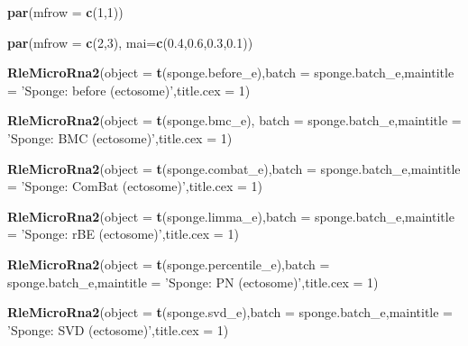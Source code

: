 \documentclass[]{book}
\newenvironment{Shaded}{\begin{snugshade}}{\end{snugshade}}
\newcommand{\KeywordTok}[1]{\textcolor[rgb]{0.13,0.29,0.53}{\textbf{#1}}}
\newcommand{\DataTypeTok}[1]{\textcolor[rgb]{0.13,0.29,0.53}{#1}}
\newcommand{\DecValTok}[1]{\textcolor[rgb]{0.00,0.00,0.81}{#1}}
\newcommand{\FloatTok}[1]{\textcolor[rgb]{0.00,0.00,0.81}{#1}}
\newcommand{\StringTok}[1]{\textcolor[rgb]{0.31,0.60,0.02}{#1}}
\newcommand{\NormalTok}[1]{#1}
\begin{document}
\begin{Shaded}
\begin{Highlighting}[]
\KeywordTok{par}\NormalTok{(}\DataTypeTok{mfrow =} \KeywordTok{c}\NormalTok{(}\DecValTok{1}\NormalTok{,}\DecValTok{1}\NormalTok{))}
\end{Highlighting}
\end{Shaded}

\begin{Shaded}
\begin{Highlighting}[]
\KeywordTok{par}\NormalTok{(}\DataTypeTok{mfrow =} \KeywordTok{c}\NormalTok{(}\DecValTok{2}\NormalTok{,}\DecValTok{3}\NormalTok{), }\DataTypeTok{mai=}\KeywordTok{c}\NormalTok{(}\FloatTok{0.4}\NormalTok{,}\FloatTok{0.6}\NormalTok{,}\FloatTok{0.3}\NormalTok{,}\FloatTok{0.1}\NormalTok{))}

\KeywordTok{RleMicroRna2}\NormalTok{(}\DataTypeTok{object =} \KeywordTok{t}\NormalTok{(sponge.before_e),}\DataTypeTok{batch =}\NormalTok{ sponge.batch_e,}\DataTypeTok{maintitle =} \StringTok{'Sponge: before (ectosome)'}\NormalTok{,}\DataTypeTok{title.cex =} \DecValTok{1}\NormalTok{)}

\KeywordTok{RleMicroRna2}\NormalTok{(}\DataTypeTok{object =} \KeywordTok{t}\NormalTok{(sponge.bmc_e), }\DataTypeTok{batch =}\NormalTok{ sponge.batch_e,}\DataTypeTok{maintitle =} \StringTok{'Sponge: BMC (ectosome)'}\NormalTok{,}\DataTypeTok{title.cex =} \DecValTok{1}\NormalTok{)}

\KeywordTok{RleMicroRna2}\NormalTok{(}\DataTypeTok{object =} \KeywordTok{t}\NormalTok{(sponge.combat_e),}\DataTypeTok{batch =}\NormalTok{ sponge.batch_e,}\DataTypeTok{maintitle =} \StringTok{'Sponge: ComBat (ectosome)'}\NormalTok{,}\DataTypeTok{title.cex =} \DecValTok{1}\NormalTok{)}

\KeywordTok{RleMicroRna2}\NormalTok{(}\DataTypeTok{object =} \KeywordTok{t}\NormalTok{(sponge.limma_e),}\DataTypeTok{batch =}\NormalTok{ sponge.batch_e,}\DataTypeTok{maintitle =} \StringTok{'Sponge: rBE (ectosome)'}\NormalTok{,}\DataTypeTok{title.cex =} \DecValTok{1}\NormalTok{)}

\KeywordTok{RleMicroRna2}\NormalTok{(}\DataTypeTok{object =} \KeywordTok{t}\NormalTok{(sponge.percentile_e),}\DataTypeTok{batch =}\NormalTok{ sponge.batch_e,}\DataTypeTok{maintitle =} \StringTok{'Sponge: PN (ectosome)'}\NormalTok{,}\DataTypeTok{title.cex =} \DecValTok{1}\NormalTok{)}

\KeywordTok{RleMicroRna2}\NormalTok{(}\DataTypeTok{object =} \KeywordTok{t}\NormalTok{(sponge.svd_e),}\DataTypeTok{batch =}\NormalTok{ sponge.batch_e,}\DataTypeTok{maintitle =} \StringTok{'Sponge: SVD (ectosome)'}\NormalTok{,}\DataTypeTok{title.cex =} \DecValTok{1}\NormalTok{)}
\end{Highlighting}
\end{Shaded}
\end{document}
